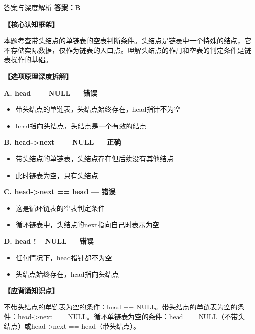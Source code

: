 \documentclass[12pt, a4paper]{article}
\newenvironment{bluebox}{\begin{framed}\begin{minipage}{\linewidth}}{\end{minipage}\end{framed}}
\begin{document}
\begin{bluebox}{答案与深度解析}
	\textbf{答案：B}

	\textbf{【核心认知框架】}

	本题考查带头结点的单链表的空表判断条件。头结点是链表中一个特殊的结点，它不存储实际数据，仅作为链表的入口点。理解头结点的作用和空表的判定条件是链表操作的基础。

	\textbf{【选项原理深度拆解】}

	\item \textbf{A. head == NULL — 错误}
	\begin{itemize}
		\item 带头结点的单链表，头结点始终存在，head指针不为空
		\item head指向头结点，头结点是一个有效的结点
	\end{itemize}

	\item \textbf{B. head->next == NULL — 正确}
	\begin{itemize}
		\item 带头结点的单链表，头结点存在但后续没有其他结点
		\item 此时链表为空，只有头结点
	\end{itemize}

	\item \textbf{C. head->next == head — 错误}
	\begin{itemize}
		\item 这是循环链表的空表判定条件
		\item 循环链表中，头结点的next指向自己时表示为空
	\end{itemize}

	\item \textbf{D. head != NULL — 错误}
	\begin{itemize}
		\item 任何情况下，head指针都不为空
		\item 头结点始终存在，head指向头结点
	\end{itemize}

	\textbf{【应背诵知识点】}

	不带头结点的单链表为空的条件：head == NULL。带头结点的单链表为空的条件：head->next == NULL。循环单链表为空的条件：head == NULL（不带头结点）或head->next == head（带头结点）。
\end{bluebox}
\end{document}
